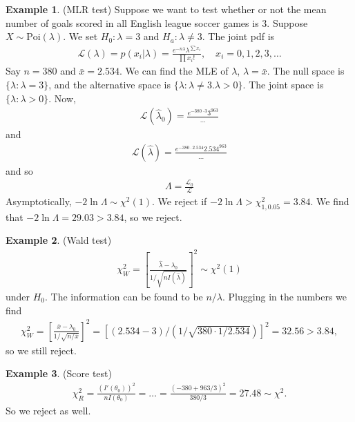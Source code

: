 \documentclass{book}
\theoremstyle{definition}
\newtheorem{exmp}{Example}[section]
\newcommand{\lag}{\mathcal{L}}
\newcommand{\f}[2]{\frac{#1}{#2}}
\newcommand{\lb}{\left[}
\newcommand{\rb}{\right]}
\begin{document}
\begin{exmp}
	(MLR test) Suppose we want to test whether or not the mean number of goals scored in all English league soccer games is 3. Suppose $X \sim \text{Poi}(\lambda)$. We set $H_0 : \lambda = 3$ and $H_a : \lambda \neq 3$. The joint pdf is 
	\begin{align}
	\lag(\lambda) = p(x_i \vert \lambda)= \f{e^{-n\lambda} \lambda^{\sum x_i}}{\prod x_i!}, \quad x_i = 0,1,2,3,\dots
	\end{align}
	Say $n=380$ and $\bar{x} = 2.534$. We can find the MLE of $\lambda$, $\hat\lambda = \bar{x}$. The null space is $\{ \lambda: \lambda = 3\}$, and the alternative space is $\{ \lambda: \lambda \neq 3. \lambda > 0 \}$. The joint space is $\{ \lambda : \lambda > 0 \}$. Now,
	\begin{align}
	\lag(\hat\lambda_0) = \f{e^{-380\cdot 3} 3^{963}}{\dots}
	\end{align}
	and
	\begin{align}
	\lag(\hat\lambda) = \f{e^{-380\cdot 2.534} 2.534^{963}}{\dots}
	\end{align}
	and so 
	\begin{align}
	\Lambda = \f{\lag_0}{\lag} 
	\end{align}
	Asymptotically, $-2\ln \Lambda \sim \chi^2(1)$. We reject if $-2\ln \Lambda > \chi^2_{1,0.05} = 3.84$. We find that $-2\ln \Lambda = 29.03 > 3.84$, so we reject. 
\end{exmp}






\begin{exmp}
	(Wald test) 
	\begin{align*}
	\chi^2_W = \lb \f{\hat\lambda - \lambda_0}{1/\sqrt{n I(\hat\lambda)}} \rb^2 \sim \chi^2(1)
	\end{align*}
	under $H_0$. The information can be found to be $n/\lambda$. Plugging in the numbers we find
	\begin{align*}
	\chi^2_W = \lb \f{\bar{x} - \lambda_0}{1/\sqrt{n/\bar{x}}} \rb^2=  \lb (2.534-3)/(1/\sqrt{380\cdot 1/2.534}) \rb^2 = 32.56 > 3.84,
	\end{align*}
	so we still reject. 
\end{exmp}



\begin{exmp}
	(Score test) 
	\begin{align*}
	\chi^2_R =  \f{(I'(\theta_0))^2}{n I(\theta_0)} = \dots = \f{(-380 + 963/3)^2}{380/3} = 27.48 \sim \chi^2.
	\end{align*}
	So we reject as well. 
\end{exmp}
\end{document}
